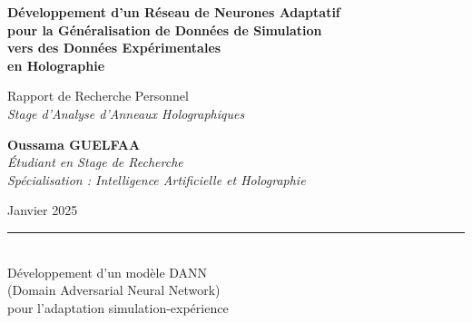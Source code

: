 \documentclass[11pt,a4paper]{article}
\title{}
\author{}
\date{}
\begin{document}
\begin{titlepage}
    \centering
    \vspace*{2cm}

    \vspace{1cm}

    {\Huge\bfseries\color{primaryblue}
    Développement d'un Réseau de Neurones Adaptatif\\
    \vspace{0.5cm}
    pour la Généralisation de Données de Simulation\\
    vers des Données Expérimentales\\
    en Holographie
    \par}

    \vspace{1.5cm}

    {\Large\color{secondaryblue}
    Rapport de Recherche Personnel\\
    \textit{Stage d'Analyse d'Anneaux Holographiques}
    \par}

    \vspace{2cm}

    {\large
    \textbf{Oussama GUELFAA}\\
    \vspace{0.5cm}
    \textit{Étudiant en Stage de Recherche}\\
    \textit{Spécialisation : Intelligence Artificielle et Holographie}
    \par}

    \vfill

    {\large
    \color{darkgray}
    Janvier 2025\\
    \vspace{0.3cm}
    \rule{0.4\textwidth}{0.5pt}\\
    \vspace{0.3cm}
    Développement d'un modèle DANN\\
    (Domain Adversarial Neural Network)\\
    pour l'adaptation simulation-expérience
    \par}

    \vspace{1cm}
\end{titlepage}

\newpage

\begin{abstract}
Ce rapport retrace mon parcours de développement d'un réseau de neurones capable de prédire les paramètres physiques (gap et L\_ecran) à partir de profils d'intensité holographiques. J'ai d'abord tenté une approche classique de régression, puis j'ai réalisé que la généralisation des données simulées vers les données expérimentales nécessitait une adaptation de domaine. Après plusieurs itérations et ajustements, j'ai finalement implémenté un modèle DANN (Domain Adversarial Neural Network) qui a permis d'obtenir des prédictions cohérentes sur 50 échantillons expérimentaux, avec un R² de 0.897 pour le paramètre gap.
\end{abstract}
\end{document}
